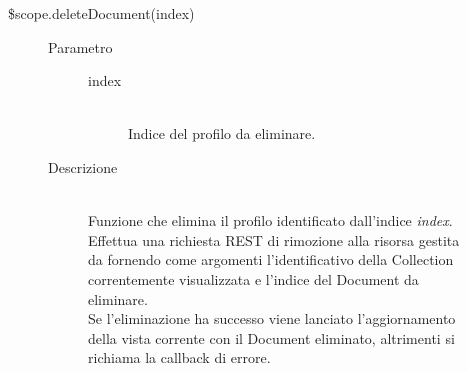 \begin{description}
\begin{description}
\begin{description}
    \end{description}
 
  
  \item[\$scope.deleteDocument(index)] \hfill
  \begin{description}
  	\item[Parametro] \hfill
  		\begin{description}
  			\item[index] \hfill \\
  			Indice del profilo da eliminare.
       \end{description}
  	\item[Descrizione] \hfill \\
   Funzione che elimina il profilo identificato dall'indice \textit{index}. Effettua una richiesta REST di rimozione alla risorsa gestita da  fornendo come argomenti l'identificativo della Collection correntemente visualizzata e l'indice del Document da eliminare. \\
  Se l'eliminazione ha successo viene lanciato l'aggiornamento della vista corrente con il Document eliminato, altrimenti si richiama la callback di errore.
    \end{description}
 
 \end{description}
\end{description}

